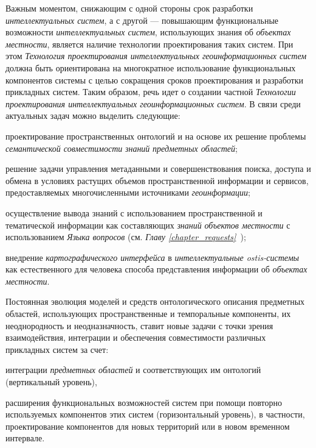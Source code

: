 Важным моментом, снижающим с одной стороны срок разработки \textit{интеллектуальных систем}, а с другой --- повышающим функциональные возможности \textit{интеллектуальных систем}, использующих знания об \textit{объектах местности}, является наличие технологии проектирования таких систем. При этом \textit{Технология проектирования интеллектуальных геоинформационных систем} должна быть ориентирована на многократное использование функциональных компонентов системы с целью сокращения сроков проектирования и разработки прикладных систем. Таким образом, речь идет о создании частной \textit{Технологии проектирования интеллектуальных геоинформационных систем}. В связи среди актуальных задач можно выделить следующие: 
\begin{textitemize}
	\item проектирование пространственных онтологий и на основе их решение проблемы \textit{семантической совместимости} \textit{знаний} \textit{предметных областей};
	\item решение задачи управления метаданными и совершенствования поиска, доступа и обмена в условиях растущих объемов пространственной информации и сервисов, предоставляемых многочисленными источниками \textit{геоинформации};
	\item осуществление вывода знаний с использованием пространственной и тематической информации как составляющих \textit{знаний} \textit{объектов местности} с использованием \textit{Языка вопросов} (см. \textit{Главу \ref{chapter_requests}~});
	\item внедрение \textit{картографического интерфейса} в \textit{интеллектуальные ostis-системы} как естественного для человека способа представления информации об \textit{объектах местности}.
\end{textitemize}

Постоянная эволюция моделей и средств онтологического описания предметных областей, использующих пространственные и темпоральные компоненты, их неоднородность и неодназначность, ставит новые задачи с точки зрения взаимодействия, интеграции и обеспечения совместимости различных прикладных систем за счет:
\begin{textitemize}
	\item интеграции \textit{предметных областей} и соответствующих им онтологий (вертикальный уровень), 
	\item расширения функциональных возможностей систем при помощи повторно используемых компонентов этих систем (горизонтальный уровень), в частности, проектирование компонентов для новых территорий или в новом временном интервале.
\end{textitemize}

